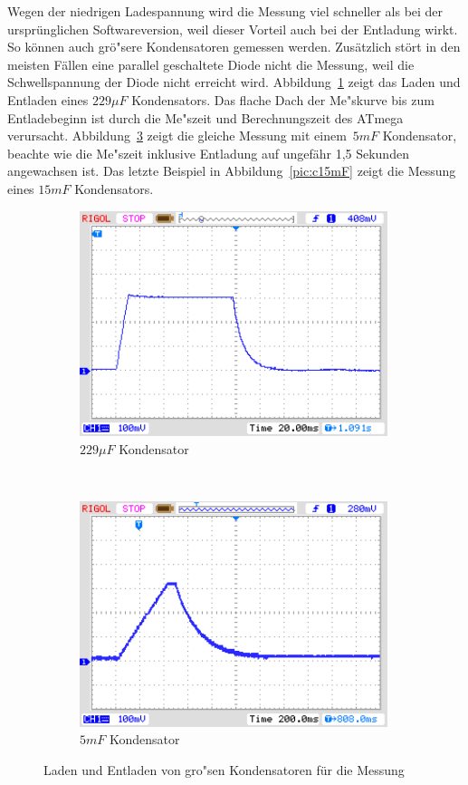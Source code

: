 Wegen der niedrigen Ladespannung wird die Messung viel schneller als bei der urspr\"unglichen Softwareversion,
weil dieser Vorteil auch bei der Entladung wirkt. So k\"onnen auch gr\"o"sere Kondensatoren gemessen werden.
Zus\"atzlich st\"ort in den meisten F\"allen eine parallel geschaltete Diode nicht die Messung, weil die Schwellspannung
der Diode nicht erreicht wird.
Abbildung~\ref{pic:c229} zeigt das Laden und Entladen eines \(229\mu F\) Kondensators.
Das flache Dach der Me"skurve bis zum Entladebeginn ist durch die Me"szeit und Berechnungszeit des ATmega verursacht.
Abbildung~\ref{pic:c5mF} zeigt die gleiche Messung mit einem~\(5mF\) Kondensator,
beachte wie die Me"szeit inklusive Entladung auf ungef\"ahr 1,5 Sekunden angewachsen ist.
Das letzte Beispiel in Abbildung~\ref{pic:c15mF} zeigt die Messung eines \(15mF\) Kondensators.

\begin{figure}[H]
  \begin{subfigure}[b]{9cm}
    \centering
    \includegraphics[width=9cm]{../PNG/charge_229uF.png}
    \caption{\(229\mu F\) Kondensator}
    \label{pic:c229}
  \end{subfigure}
  ~
  \begin{subfigure}[b]{9cm}
    \centering
    \includegraphics[width=9cm]{../PNG/charge_5mF.png}
    \caption{\(5mF\) Kondensator}
    \label{pic:c5mF}
  \end{subfigure}
  \caption{Laden und Entladen von gro"sen Kondensatoren f\"ur die Messung}
\end{figure}

